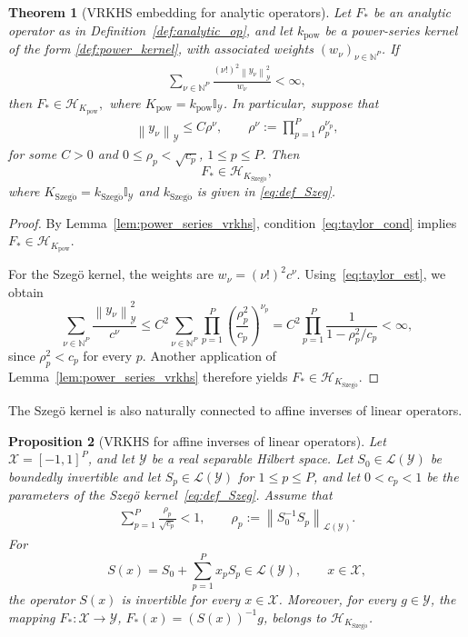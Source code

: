 \documentclass[11pt]{article}
\numberwithin{equation}{section}
\theoremstyle{plain}
\newtheorem{theorem}{Theorem}[section]
\newtheorem{proposition}[theorem]{Proposition}
\theoremstyle{definition}
\theoremstyle{remark}
\newcommand{\X}{\mathcal{X}}
\newcommand{\Hs}{\mathcal{H}}
\newcommand{\Y}{\mathcal{Y}}
\newcommand{\I}{\mathbb{I}}
\newcommand{\norm}[1]{\left\lVert#1\right\rVert}
\begin{document}
\begin{theorem}[VRKHS embedding for analytic operators]
\label{thm:main_kernel_op}
Let $F_*$ be an analytic operator as in Definition~\ref{def:analytic_op},
and let $k_{\mathrm{pow}}$ be a power-series kernel of the form
\eqref{def:power_kernel}, with associated weights
$(w_\nu)_{\nu\in\mathbb{N}^P}$. If
\begin{align}\label{eq:taylor_cond}
\sum_{\nu\in\mathbb{N}^P}
\frac{(\nu!)^2\norm{y_\nu}_{\Y}^2}{w_\nu}
<\infty,
\end{align}
then
\(
F_*\in\Hs_{K_{\mathrm{pow}}},
\)
where
$K_{\mathrm{pow}}=k_{\mathrm{pow}}\I_{\Y}$.
In particular, suppose that
\begin{align}\label{eq:taylor_est}
\norm{y_\nu}_{\Y}\leq C\rho^\nu,
\qquad
\rho^\nu:=\prod_{p=1}^P\rho_p^{\nu_p},
\end{align}
for some $C>0$ and $0\leq \rho_p<\sqrt{c_p}$, $1\leq p\leq P$. Then
$$
F_*\in\Hs_{K_{\mathrm{Szeg\ddot{o}}}},
$$
where $K_{\mathrm{Szeg\ddot{o}}}=k_{\mathrm{Szeg\ddot{o}}}\I_{\Y}$ and $k_{\mathrm{Szeg\ddot{o}}}$ is given in \eqref{eq:def_Szeg}.
\end{theorem}

\begin{proof}
By Lemma~\ref{lem:power_series_vrkhs},
condition~\eqref{eq:taylor_cond} implies
$F_*\in\Hs_{K_{\mathrm{pow}}}$.

For the Szegö kernel, the weights are
$w_\nu=(\nu!)^2c^\nu$. Using~\eqref{eq:taylor_est}, we obtain
\[
\sum_{\nu\in\mathbb{N}^P}
\frac{\norm{y_\nu}_{\Y}^2}{c^\nu}
\leq
C^2\sum_{\nu\in\mathbb{N}^P}
\prod_{p=1}^P
\left(\frac{\rho_p^2}{c_p}\right)^{\nu_p}=
C^2\prod_{p=1}^P
\frac{1}{1-\rho_p^2/c_p}
<\infty,
\]
since $\rho_p^2<c_p$ for every $p$.
Another application of Lemma~\ref{lem:power_series_vrkhs}
therefore yields
$F_*\in\Hs_{K_{\mathrm{Szeg\ddot{o}}}}$.
\end{proof}

The Szegö kernel is also naturally connected to affine inverses of linear
operators.

\begin{proposition}[VRKHS for affine inverses of linear operators]
\label{pro:inversion_abstract}
Let \(\mathcal X=[-1,1]^P\), and let \(\mathcal Y\) be a real separable Hilbert space. Let
$S_0\in\mathcal{L}(\Y)$ be boundedly invertible and let
$S_p\in\mathcal{L}(\Y)$ for $1\leq p\leq P$, and let $0<c_p<1$ be the parameters of the Szegö kernel~\eqref{eq:def_Szeg}. Assume that
\begin{align}\label{eq:summ_condition_inversion}
\sum_{p=1}^P\frac{\rho_p}{\sqrt{c_p}}<1,\qquad \rho_p:=
\norm{S_0^{-1}S_p}_{\mathcal{L}(\Y)}.
\end{align}
For
\[
S(x)=S_0+\sum_{p=1}^P x_pS_p\in\mathcal{L}(\Y),
\qquad x\in\X,
\]
the operator $S(x)$ is invertible for every $x\in\X$. Moreover, for every
$g\in\Y$, the mapping
$F_*\colon\X\to\Y$, $F_*(x)=(S(x))^{-1}g$,
belongs to $\Hs_{K_{\mathrm{Szeg\ddot{o}}}}$.
\end{proposition}
\end{document}
